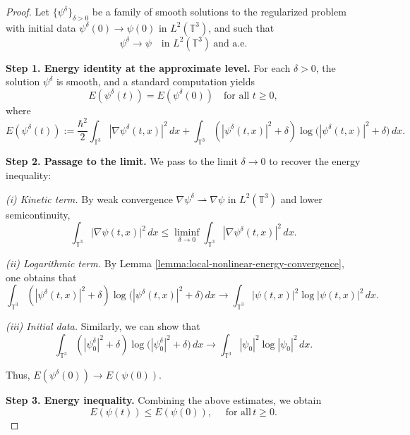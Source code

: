 \documentclass[11pt]{article}
\begin{document}
\begin{proof}
Let $\{\psi^\delta\}_{\delta>0}$ be a family of smooth solutions to the regularized problem
with  initial data $\psi^\delta(0)\to \psi(0)$ in $L^2(\mathbb{T}^3)$, and such that
\[
\psi^\delta \to \psi \quad \text{in } L^2(\mathbb{T}^3) \ \text{and a.e.}
\]

\medskip

\noindent
\textbf{Step 1. Energy identity at the approximate level.}
For each $\delta>0$, the solution $\psi^\delta$ is smooth, and a standard computation yields
\[
E(\psi^\delta(t))
=
E(\psi^\delta(0))
\quad \text{for all } t\ge 0,
\]
where
\[
E(\psi^\delta(t))
:=
\frac{\hbar^2}{2}\int_{\mathbb{T}^3} |\nabla \psi^\delta(t,x)|^2\,dx
+
\int_{\mathbb{T}^3}( |\psi^\delta(t,x)|^2+\delta) \log\big(|\psi^\delta(t,x)|^2+\delta\big)\,dx.
\]
\medskip

\noindent
\textbf{Step 2. Passage to the limit.} We pass to the limit $\delta\to 0$ to recover the energy inequality:

\medskip

\noindent
\emph{(i) Kinetic term.}
By weak convergence $\nabla \psi^\delta \rightharpoonup \nabla \psi$ in $L^2(\mathbb{T}^3)$ and lower semicontinuity,
\[
\int_{\mathbb{T}^3 }|\nabla \psi(t,x)|^2\,dx
\leq
\liminf_{\delta\to 0}
\int_{\mathbb{T}^3} |\nabla \psi^\delta(t,x)|^2\,dx.
\]

\medskip

\noindent
\emph{(ii) Logarithmic term.}
By Lemma \ref{lemma:local-nonlinear-energy-convergence},  one obtains that 
\[
\int_{\mathbb{T}^3} (|\psi^\delta(t,x)|^2+\delta) \log\big(|\psi^\delta(t,x)|^2+\delta\big)\,dx\to \int_{\mathbb{T}^3} |\psi(t,x)|^2 \log |\psi(t,x)|^2\,dx.
\]

\medskip

\noindent
\emph{(iii) Initial data.}
Similarly, we can show that \[
\int_{\mathbb{T}^3} (|\psi^\delta_{0}|^2+\delta) \log\big(|\psi^\delta_{0}|^2+\delta\big)\,dx\to \int_{\mathbb{T}^3}|\psi_0|^2 \log |\psi_0|^2\,dx.
\]

Thus, 
$
E(\psi^\delta(0))
\to
E(\psi(0)).
$

\medskip

\noindent
\textbf{Step 3. Energy inequality.} Combining the above estimates, we obtain
\begin{equation}
\label{energy inequality}
E(\psi(t))\leq 
E(\psi(0)),\quad\text{ for all} \,t\geq 0.
\end{equation}
\medskip








\end{proof}
\end{document}
